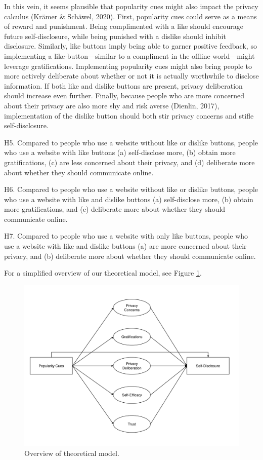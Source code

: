 \documentclass[
  english,
  man,floatsintext]{apa6}
\begin{document}
In this vein, it seems plausible that popularity cues might also impact the privacy calculus (Krämer \& Schäwel, 2020).
First, popularity cues could serve as a means of reward and punishment.
Being complimented with a like should encourage future self-disclosure, while being punished with a dislike should inhibit disclosure.
Similarly, like buttons imply being able to garner positive feedback, so implementing a like-button---similar to a compliment in the offline world---might leverage gratifications.
Implementing popularity cues might also bring people to more actively deliberate about whether or not it is actually worthwhile to disclose information.
If both like and dislike buttons are present, privacy deliberation should increase even further.
Finally, because people who are more concerned about their privacy are also more shy and risk averse (Dienlin, 2017), implementation of the dislike button should both stir privacy concerns and stifle self-disclosure.

H5. Compared to people who use a website without like or dislike buttons, people who use a website with like buttons (a) self-disclose more, (b) obtain more gratifications, (c) are less concerned about their privacy, and (d) deliberate more about whether they should communicate online.

H6. Compared to people who use a website without like or dislike buttons, people who use a website with like and dislike buttons (a) self-disclose more, (b) obtain more gratifications, and (c) deliberate more about whether they should communicate online.

H7. Compared to people who use a website with only like buttons, people who use a website with like and dislike buttons (a) are more concerned about their privacy, and (b) deliberate more about whether they should communicate online.

For a simplified overview of our theoretical model, see Figure \ref{fig:model}.

\begin{figure}

{\centering \includegraphics[width=.8\textwidth]{../figures/design/model} 

}

\caption{Overview of theoretical model.}\label{fig:model}
\end{figure}
\end{document}
